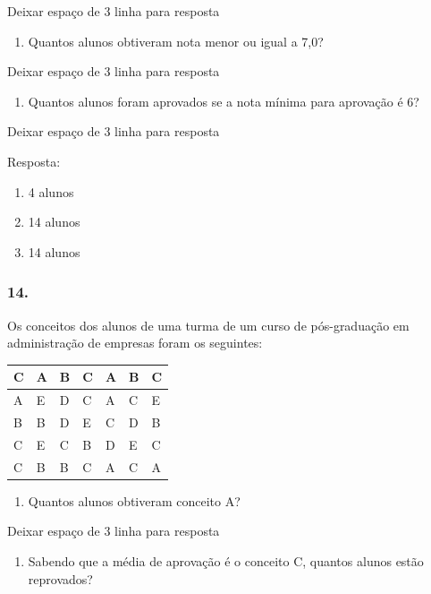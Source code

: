 Deixar espaço de 3 linha para resposta

\begin{enumerate}
\def\labelenumi{\alph{enumi})}
\item
  Quantos alunos obtiveram nota menor ou igual a 7,0?
\end{enumerate}

Deixar espaço de 3 linha para resposta

\begin{enumerate}
\def\labelenumi{\alph{enumi})}
\item
  Quantos alunos foram aprovados se a nota mínima para aprovação é 6?
\end{enumerate}

Deixar espaço de 3 linha para resposta

Resposta:

\begin{enumerate}
\def\labelenumi{\alph{enumi})}
\item
  4 alunos
\item
  14 alunos
\item
  14 alunos
\end{enumerate}

\subsubsection{14.}\label{section-120}

Os conceitos dos alunos de uma turma de um curso de pós-graduação em
administração de empresas foram os seguintes:

\begin{longtable}[]{@{}lllllll@{}}
\toprule
C & A & B & C & A & B & C\tabularnewline
\midrule
\endhead
A & E & D & C & A & C & E\tabularnewline
B & B & D & E & C & D & B\tabularnewline
C & E & C & B & D & E & C\tabularnewline
C & B & B & C & A & C & A\tabularnewline
\bottomrule
\end{longtable}

\begin{enumerate}
\def\labelenumi{\alph{enumi})}
\item
  Quantos alunos obtiveram conceito A?
\end{enumerate}

Deixar espaço de 3 linha para resposta

\begin{enumerate}
\def\labelenumi{\alph{enumi})}
\item
  Sabendo que a média de aprovação é o conceito C, quantos alunos estão
  reprovados?
\end{enumerate}


